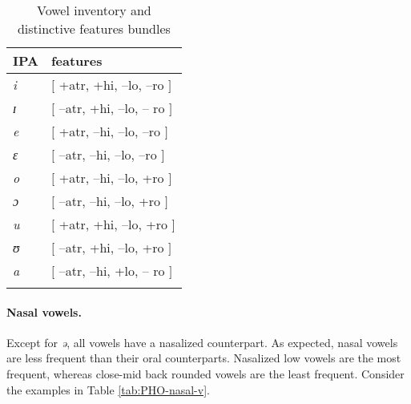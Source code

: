 \begin{table}[thb] \small
  \centering
 \caption{Vowel inventory and distinctive features bundles}
  \label{tab:featspec}
  \begin{tabular}[!htb]{ll}
\lsptoprule
IPA  & features   \\[1ex] \midrule 

{\it i} & $[$ {\sc +atr}, {\sc +hi}, {\sc --lo},  {\sc --ro}
 $]$\\
{\it ɪ} & $[$ {\sc --atr},  {\sc +hi}, {\sc --lo}, {\sc --
ro}
$]$\\
{\it e} & $[$  {\sc +atr},  {\sc --hi}, {\sc --lo},  {\sc
--ro} $]$\\
{\it ɛ} & $[$  {\sc --atr},  {\sc --hi},  {\sc --lo},  {\sc
--ro} $]$\\
{\it o} & $[$  {\sc +atr},  {\sc --hi},  {\sc --lo},  {\sc
+ro} $]$\\
{\it ɔ} & $[$  {\sc --atr},  {\sc --hi}, {\sc --lo}, {\sc
+ro} $]$\\
{\it u} & $[$  {\sc +atr},  {\sc +hi},  {\sc --lo},  {\sc
+ro} $]$ \\
{\it ʊ} & $[$  {\sc --atr},  {\sc +hi},  {\sc --lo},  {\sc
+ro} $]$\\
{\it a} &  $[$  {\sc --atr}, {\sc --hi},  {\sc +lo}, {\sc --
ro}  $]$\\

\lspbottomrule 


  \end{tabular}
 
\end{table}



\paragraph{Nasal vowels.}
\label{sec:nasal-v}

Except for  \textit{ə},  all vowels have a nasalized counterpart. As 
expected, nasal vowels are less
frequent than their oral counterparts. Nasalized  low vowels   are the most
frequent, whereas  close-mid back rounded vowels  are the least
frequent. Consider the examples in Table
\ref{tab:PHO-nasal-v}.


